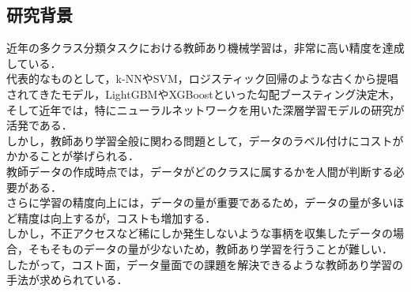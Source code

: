 \subsection*{研究背景}

近年の多クラス分類タスクにおける教師あり機械学習は，非常に高い精度を達成している．\\

代表的なものとして，k-NN\cite{knn}やSVM\cite{svm}，ロジスティック回帰のような古くから提唱されてきたモデル，LightGBM\cite{lightgbm}やXGBoost\cite{xgboost}といった勾配ブースティング決定木，そして近年では，特にニューラルネットワークを用いた深層学習モデルの研究が活発である．\\

しかし，教師あり学習全般に関わる問題として，データのラベル付けにコストがかかることが挙げられる．\\
教師データの作成時点では，データがどのクラスに属するかを人間が判断する必要がある．\\

さらに学習の精度向上には，データの量が重要であるため，データの量が多いほど精度は向上するが，コストも増加する．\\

しかし，不正アクセスなど稀にしか発生しないような事柄を収集したデータの場合，そもそものデータの量が少ないため，教師あり学習を行うことが難しい．\\

したがって，コスト面，データ量面での課題を解決できるような教師あり学習の手法が求められている．\\

